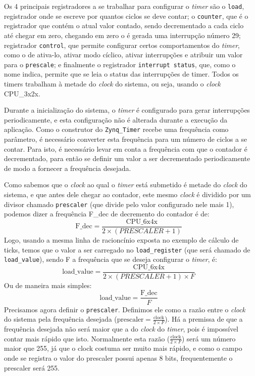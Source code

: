 Os 4 principais registradores a se trabalhar para configurar o \emph{timer} são o \verb+load+, registrador onde se escreve por quantos ciclos se deve contar; o \verb+counter+, que é o registrador que contém o atual valor contado, sendo decrementado a cada ciclo até chegar em zero, chegando em zero o é gerada uma interrupção número 29; registrador \verb+control+, que permite configurar certos comportamentos do \emph{timer}, como o de ativa-lo, ativar modo cíclico, ativar interrupções e atribuir um valor para o \verb+prescale+; e finalmente o registrador \verb+interrupt status+, que, como o nome indica, permite que se leia o status das interrupções de timer. Todos os timers trabalham à metade do \emph{clock} do sistema, ou seja, usando o \emph{clock} CPU\_3x2x.

Durante a inicialização do sistema, o \emph{timer} é configurado para gerar interrupções periodicamente, e esta configuração não é alterada durante a execução da aplicação. Como o construtor do \verb+Zynq_Timer+ recebe uma frequência como parâmetro, é necessário converter esta frequência para um número de ciclos a se contar. Para isto, é necessário levar em conta a frequência com que o contador é decrementado, para então se definir um valor a ser decrementado periodicamente de modo a fornecer a frequência desejada.

Como sabemos que o \emph{clock} ao qual o \emph{timer} está submetido é metade do \emph{clock} do sistema, e que antes dele chegar ao contador, este mesmo \emph{clock} é dividido por um divisor chamado \verb+prescaler+ (que divide pelo valor configurado nele mais 1), podemos dizer a frequência F\_dec de decremento do contador é de:
\begin{equation}
	\text{F\_dec} = \frac{\text{CPU\_6x4x}}{2 \times (PRESCALER+1)}
\end{equation}
Logo, usando a mesma linha de racioncínio exposta no exemplo de cálculo de ticks, temos que o valor a ser carregado no \verb+load_register+ (que será chamado de \verb+load_value+), sendo F a frequência que se deseja configurar o \emph{timer}, é:
\begin{equation}
	\text{load\_value} = \frac{\text{CPU\_6x4x}}{2 \times (PRESCALER+1) \times F}
\end{equation}
Ou de maneira mais simples:
\begin{equation}
	\text{load\_value} = \frac{\text{F\_dec}}{F}
\end{equation}
Precisamos agora definir o \verb+prescaler+. Definimos ele como a razão entre o \emph{clock} do sistema pela frequência desejada ($\text{prescaler}=\frac{\text{clock}}{2 \times F}$). Há a premissa de que a frequência desejada não será maior que a do \emph{clock} do \emph{timer}, pois é impossível contar mais rápido que isto. Normalmente esta razão ($\frac{\text{clock}}{2 \times F}$) será um número maior que 255, já que o clock costuma ser muito mais rápido, e como o campo onde se registra o valor do prescaler possui apenas 8 bits, frequentemente o prescaler será 255.


